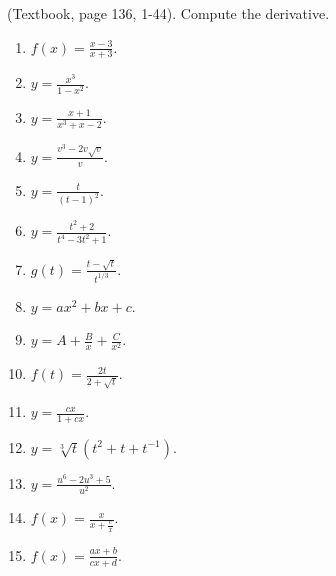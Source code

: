 (Textbook, page 136, 1-44). Compute the derivative.
\begin{multicols}{2}
\begin{enumerate}

\item $f(x)=\frac{x-3}{x+3}$.

\item $y=\frac{x^3}{1-x^2}$.

\item $y=\frac{x+1}{x^3+x-2}$.

\item $y=\frac{v^3-2v\sqrt{v}}{v}$.

\item $y=\frac{t}{(t-1)^2}$.

\item $y=\frac{t^2+2}{t^4-3t^2+1}$.

\item $g(t)=\frac{t-\sqrt{t}}{t^{1/3}}$.

\item $y=a x^2+b x + c$.

\item $y=A+\frac{B}x +\frac{C}{x^2}$.

\item $f(t)=\frac{2t}{2+\sqrt{t}}$.

\item $y=\frac{c x}{1+c x}$.

\item $y=\sqrt[3]{t}(t^2+t+t^{-1}) $.

\item $y=\frac{u^6-2u^3+5}{u^2}$.

\item $f(x)=\frac{x}{x+\frac{c}{x}}$.

\item $f(x)=\frac{a x+b}{c x+ d}$.

\end{enumerate}
\end{multicols}

